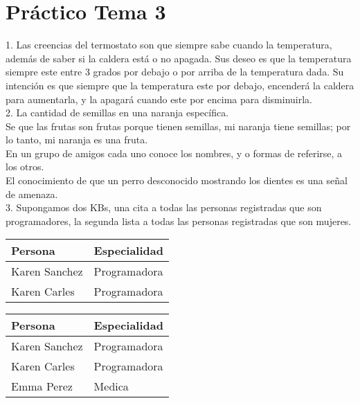 \chapter{Práctico Tema 3}

1. Las creencias del termostato son que siempre sabe cuando la temperatura, además de saber si la caldera está o no apagada. Sus deseo es que la temperatura siempre este entre 3 grados por debajo o por arriba de la temperatura dada. Su intención es que siempre que la temperatura este por debajo, encenderá la caldera para aumentarla, y la apagará cuando este por encima para disminuirla. \\

2. La cantidad de semillas en una naranja específica. \\

Se que las frutas son frutas porque tienen semillas, mi naranja tiene semillas; por lo tanto, mi naranja es una fruta. \\

En un grupo de amigos cada uno conoce los nombres, y o formas de referirse, a los otros. \\

El conocimiento de que un perro desconocido mostrando los dientes es una señal de amenaza. \\

3. Supongamos dos KBs, una cita a todas las personas registradas que son programadores, la segunda lista a todas las personas registradas que son mujeres.

\begin{table}[h]
	\begin{tabular}{l|l}
		Persona       & Especialidad \\ \hline
		Karen Sanchez & Programadora \\
		Karen Carles & Programadora  \\
	\end{tabular}
\end{table}


\begin{table}[h]
	\begin{tabular}{l|l}
		Persona       & Especialidad  \\ \hline
		Karen Sanchez & Programadora  \\
		Karen Carles & Programadora   \\
		Emma Perez & Medica           \\
	\end{tabular}
\end{table}

